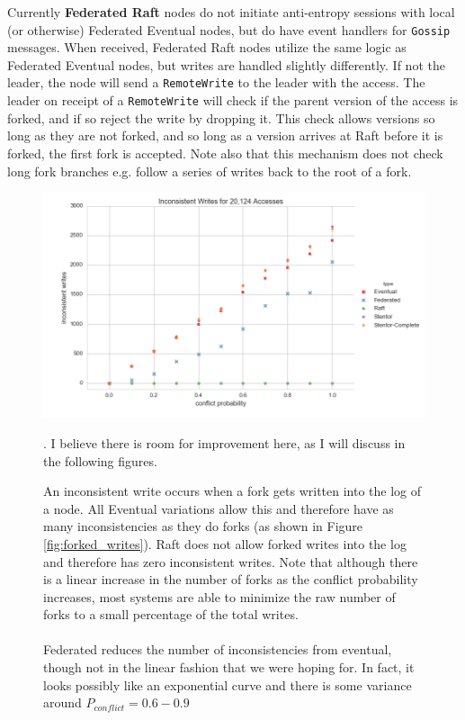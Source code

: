 \documentclass[11pt,letterpaper]{article}
\begin{document}
Currently \textbf{Federated Raft} nodes do not initiate anti-entropy sessions with local (or otherwise) Federated Eventual nodes, but do have event handlers for \texttt{Gossip} messages. When received, Federated Raft nodes utilize the same logic as Federated Eventual nodes, but writes are handled slightly differently. If not the leader, the node will send a \texttt{RemoteWrite} to the leader with the access. The leader on receipt of a \texttt{RemoteWrite} will check if the parent version of the access is forked, and if so reject the write by dropping it. This check allows versions so long as they are not forked, and so long as a version arrives at Raft before it is forked, the first fork is accepted. Note also that this mechanism does not check long fork branches e.g. follow a series of writes back to the root of a fork.

\begin{figure}[!h]
    \centering
        \includegraphics[width=\textwidth]{figures/inconsistent_writes.png}
        \caption{\textsf{An inconsistent write occurs when a fork gets written into the log of a node. All Eventual variations allow this and therefore have as many inconsistencies as they do forks (as shown in Figure \ref{fig:forked_writes}). Raft does not allow forked writes into the log and therefore has zero inconsistent writes. Note that although there is a linear increase in the number of forks as the conflict probability increases, most systems are able to minimize the raw number of forks to a small percentage of the total writes.\\
\\
        Federated reduces the number of inconsistencies from eventual, though not in the linear fashion that we were hoping for. In fact, it looks possibly like an exponential curve and there is some variance around $P_{conflict}=0.6-0.9$}}. I believe there is room for improvement here, as I will discuss in the following figures.
        \label{fig:inconsistent_writes}
\end{figure}
\end{document}
